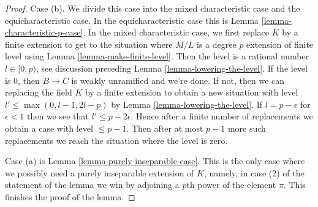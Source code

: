 \documentclass[10pt,a4paper]{amsart}
\theoremstyle{plain}
\theoremstyle{definition}
\theoremstyle{remark}
\numberwithin{equation}{subsection}
\begin{document}
\begin{proof}
\medskip\noindent
Case (b). We divide this case into the mixed characteristic case and the
equicharacteristic case. In the equicharacteristic case this is
Lemma \ref{lemma-characteristic-p-case}. In the mixed characteristic
case, we first replace $K$ by a finite extension to get to the
situation where $M/L$ is a degree $p$ extension of finite level using
Lemma \ref{lemma-make-finite-level}.
Then the level is a rational number $l \in [0, p)$, see discussion
preceding Lemma \ref{lemma-lowering-the-level}. If the level is $0$,
then $B \to C$ is weakly unramified and we're done. If not, then we
can replacing the field $K$ by a finite extension to obtain a new
situation with level $l' \leq \max(0, l - 1, 2l - p)$ by
Lemma \ref{lemma-lowering-the-level}.
If $l = p - \epsilon$ for $\epsilon < 1$ then we see that
$l' \leq p - 2\epsilon$. Hence after a finite number of replacements
we obtain a case with level $\leq p - 1$. Then after at most $p - 1$
more such replacements we reach the situation where the level is zero.

\medskip\noindent
Case (a) is Lemma \ref{lemma-purely-inseparable-case}. This is the only case
where we possibly need a purely inseparable extension of $K$, namely, in
case (2) of the statement of the lemma we win by adjoining a $p$th power
of the element $\pi$. This finishes the proof of the lemma.
\end{proof}
\end{document}
